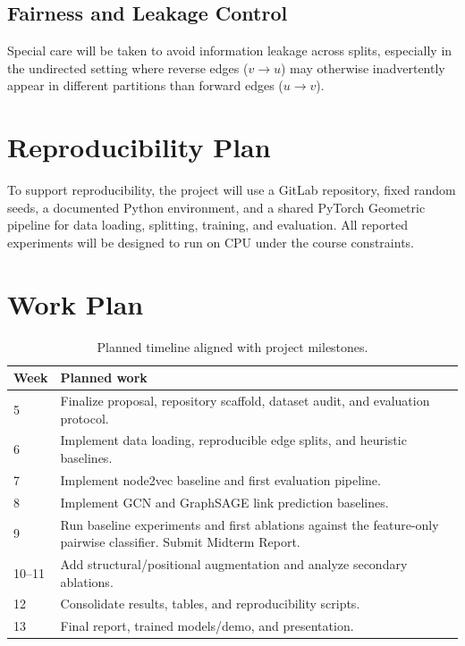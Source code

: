 \documentclass[11pt,a4paper]{article}
\begin{document}
\subsection{Fairness and Leakage Control}
Special care will be taken to avoid information leakage across splits,
especially in the undirected setting where reverse edges ($v \rightarrow u$) may otherwise inadvertently appear in different partitions than forward edges ($u \rightarrow v$).

\section{Reproducibility Plan}

To support reproducibility, the project will use a GitLab repository,
fixed random seeds, a documented Python environment, and a shared PyTorch Geometric pipeline
for data loading, splitting, training, and evaluation.
All reported experiments will be designed to run on CPU under the course constraints.

\newpage
\section{Work Plan}

\begin{table}[ht]
\centering
\begin{tabular}{lp{12cm}}
\toprule
\textbf{Week} & \textbf{Planned work} \\
\midrule
5  & Finalize proposal, repository scaffold, dataset audit, and evaluation protocol. \\
6  & Implement data loading, reproducible edge splits, and heuristic baselines. \\
7  & Implement node2vec baseline and first evaluation pipeline. \\
8  & Implement GCN and GraphSAGE link prediction baselines. \\
9  & Run baseline experiments and first ablations against the feature-only pairwise classifier. Submit Midterm Report. \\
10--11 & Add structural/positional augmentation and analyze secondary ablations. \\
12 & Consolidate results, tables, and reproducibility scripts. \\
13 & Final report, trained models/demo, and presentation. \\
\bottomrule
\end{tabular}
\caption{Planned timeline aligned with project milestones.}
\end{table}
\end{document}
